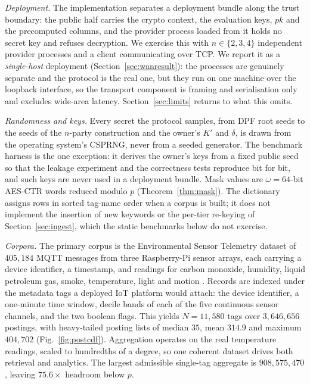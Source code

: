 \documentclass[a4paper,fleqn]{cas-dc}
\begin{document}
\emph{Deployment.} The implementation separates a deployment bundle along
the trust boundary: the public half carries the crypto context, the evaluation keys,
$pk$ and the precomputed columns, and the provider process loaded from it
holds no secret key and refuses decryption. We exercise this with
$n\in\{2,3,4\}$ independent provider processes and a client communicating over
TCP. We report it as a \emph{single-host} deployment
(Section~\ref{sec:wanresult}): the processes are genuinely separate and the
protocol is the real one, but they run on one machine over the loopback
interface, so the transport component is framing and serialisation only and
excludes wide-area latency. Section~\ref{sec:limits} returns to what this
omits.

\emph{Randomness and keys.} Every secret the protocol samples, from DPF root
seeds to the seeds of the $n$-party construction and the owner's $K'$ and
$\delta$, is drawn from the operating system's CSPRNG, never from a seeded
generator. The benchmark harness is the one exception: it derives the owner's
keys from a fixed public seed so that the leakage experiment and the
correctness tests reproduce bit for bit, and such keys are never used in a
deployment bundle. Mask values are $\omega=64$-bit AES-CTR words reduced
modulo $p$ (Theorem~\ref{thm:mask}). The dictionary assigns rows in
sorted tag-name order when a corpus is built; it does not implement the
insertion of new keywords or the per-tier re-keying of
Section~\ref{sec:ingest}, which the static benchmarks below do not exercise.

\emph{Corpora.} The primary corpus is the Environmental Sensor Telemetry
dataset of $405{,}184$ MQTT messages from three Raspberry-Pi sensor arrays,
each carrying a device identifier, a timestamp, and readings for carbon
monoxide, humidity, liquid petroleum gas, smoke, temperature, light and motion
\citep{stafford_2020_environmental}. Records are indexed under the metadata
tags a deployed IoT platform would attach: the device identifier, a one-minute
time window, decile bands of each of the five continuous sensor channels, and
the two boolean flags. This yields $N=11{,}580$ tags over $3{,}646{,}656$
postings, with heavy-tailed posting lists of median $35$, mean $314.9$ and
maximum $404{,}702$ (Fig.~\ref{fig:postcdf}). Aggregation operates on the real
temperature readings, scaled to hundredths of a degree, so one coherent
dataset drives both retrieval and analytics. The largest admissible single-tag
aggregate is $908{,}575{,}470$, leaving $75.6\times$ headroom below $p$.
\end{document}
